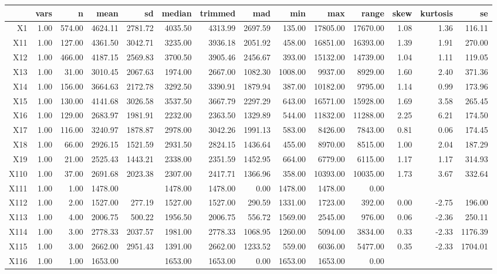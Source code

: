 \documentclass[a4paper,headsepline,footsepline,fontsize=11pt,BCOR=12mm,DIV=12]{report}
\begin{document}
\begin{tabular}{rrrrrrrrrrrrrr}
  \hline
 & vars & n & mean & sd & median & trimmed & mad & min & max & range & skew & kurtosis & se \\ 
  \hline
X1 & 1.00 & 574.00 & 4624.11 & 2781.72 & 4035.50 & 4313.99 & 2697.59 & 135.00 & 17805.00 & 17670.00 & 1.08 & 1.36 & 116.11 \\ 
  X11 & 1.00 & 127.00 & 4361.50 & 3042.71 & 3235.00 & 3936.18 & 2051.92 & 458.00 & 16851.00 & 16393.00 & 1.39 & 1.91 & 270.00 \\ 
  X12 & 1.00 & 466.00 & 4187.15 & 2569.83 & 3700.50 & 3905.46 & 2456.67 & 393.00 & 15132.00 & 14739.00 & 1.04 & 1.11 & 119.05 \\ 
  X13 & 1.00 & 31.00 & 3010.45 & 2067.63 & 1974.00 & 2667.00 & 1082.30 & 1008.00 & 9937.00 & 8929.00 & 1.60 & 2.40 & 371.36 \\ 
  X14 & 1.00 & 156.00 & 3664.63 & 2172.78 & 3292.50 & 3390.91 & 1879.94 & 387.00 & 10182.00 & 9795.00 & 1.14 & 0.99 & 173.96 \\ 
  X15 & 1.00 & 130.00 & 4141.68 & 3026.58 & 3537.50 & 3667.79 & 2297.29 & 643.00 & 16571.00 & 15928.00 & 1.69 & 3.58 & 265.45 \\ 
  X16 & 1.00 & 129.00 & 2683.97 & 1981.91 & 2232.00 & 2363.50 & 1329.89 & 544.00 & 11832.00 & 11288.00 & 2.25 & 6.21 & 174.50 \\ 
  X17 & 1.00 & 116.00 & 3240.97 & 1878.87 & 2978.00 & 3042.26 & 1991.13 & 583.00 & 8426.00 & 7843.00 & 0.81 & 0.06 & 174.45 \\ 
  X18 & 1.00 & 66.00 & 2926.15 & 1521.59 & 2931.50 & 2824.15 & 1436.64 & 455.00 & 8970.00 & 8515.00 & 1.00 & 2.04 & 187.29 \\ 
  X19 & 1.00 & 21.00 & 2525.43 & 1443.21 & 2338.00 & 2351.59 & 1452.95 & 664.00 & 6779.00 & 6115.00 & 1.17 & 1.17 & 314.93 \\ 
  X110 & 1.00 & 37.00 & 2691.68 & 2023.38 & 2307.00 & 2417.71 & 1366.96 & 358.00 & 10393.00 & 10035.00 & 1.73 & 3.67 & 332.64 \\ 
  X111 & 1.00 & 1.00 & 1478.00 &  & 1478.00 & 1478.00 & 0.00 & 1478.00 & 1478.00 & 0.00 &  &  &  \\ 
  X112 & 1.00 & 2.00 & 1527.00 & 277.19 & 1527.00 & 1527.00 & 290.59 & 1331.00 & 1723.00 & 392.00 & 0.00 & -2.75 & 196.00 \\ 
  X113 & 1.00 & 4.00 & 2006.75 & 500.22 & 1956.50 & 2006.75 & 556.72 & 1569.00 & 2545.00 & 976.00 & 0.06 & -2.36 & 250.11 \\ 
  X114 & 1.00 & 3.00 & 2778.33 & 2037.57 & 1981.00 & 2778.33 & 1068.95 & 1260.00 & 5094.00 & 3834.00 & 0.33 & -2.33 & 1176.39 \\ 
  X115 & 1.00 & 3.00 & 2662.00 & 2951.43 & 1391.00 & 2662.00 & 1233.52 & 559.00 & 6036.00 & 5477.00 & 0.35 & -2.33 & 1704.01 \\ 
  X116 & 1.00 & 1.00 & 1653.00 &  & 1653.00 & 1653.00 & 0.00 & 1653.00 & 1653.00 & 0.00 &  &  &  \\ 
   \hline
\end{tabular}
\end{document}
